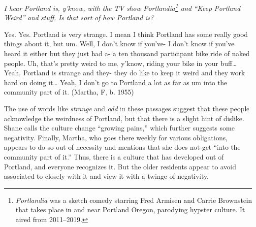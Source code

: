 \begin{num_quote}
    \textit{I hear Portland is, y'know, with the TV show Portlandia\footnote{\textit{Portlandia} was a sketch comedy starring Fred Armisen and Carrie Brownstein that takes place in and near Portland Oregon, parodying hypster culture. It aired from 2011--2019.} and ``Keep Portland Weird'' and stuff. Is that sort of how Portland is?	}

    Yes. Yes. Portland is very strange. I mean I think Portland has some really good things about it, but um. Well, I don't know if you've- I don't know if you've heard it either but they just had a- a ten thousand participant bike ride of naked people. Uh, that's pretty weird to me, y'know, riding your bike in your buff… Yeah, Portland is strange and they- they do like to keep it weird and they work hard on doing it… Yeah, I don't go to Portland a lot as far as um into the community part of it. (Martha, F, b. 1955)\label{quote:portland_is_strange}
\end{num_quote}
The use of words like \textit{strange} and \textit{odd} in these passages suggest that these people acknowledge the weirdness of Portland, but that there is a slight hint of dislike. Shane calls the culture change ``growing pains,'' which further suggests some negativity. Finally, Martha, who goes there weekly for various obligations, appears to do so out of necessity and mentions that she does not get ``into the community part of it.'' Thus, there is a culture that has developed out of Portland, and everyone recognizes it. But the older residents appear to avoid associated to closely with it and view it with a twinge of negativity.


